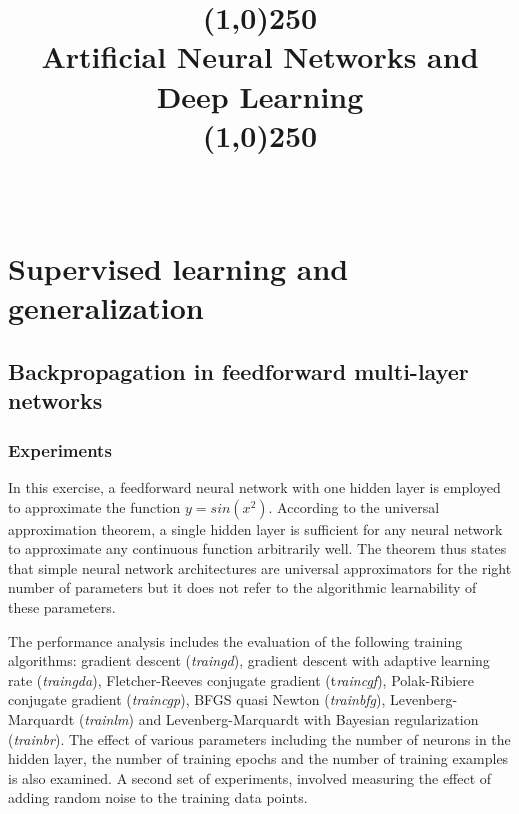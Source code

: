 \documentclass[conference,compsoc]{IEEEtran}
\begin{document}
%
\title{\line(1,0){250}\\Artificial Neural Networks and Deep Learning\\\line(1,0){250}}


\author{
\\
}

% 
\maketitle


\IEEEpeerreviewmaketitle


\thispagestyle{plain}
\pagestyle{plain}

\section{Supervised learning and generalization}

\subsection{Backpropagation in feedforward multi-layer networks}

\subsubsection{Experiments}
In this exercise, a feedforward neural network with one hidden layer is employed to approximate the function $y=sin(x^2)$. According to the universal approximation theorem, a single hidden layer is sufficient for any neural network to approximate any continuous function arbitrarily well. The theorem thus states that simple neural network architectures are universal approximators for the right number of parameters but it does not refer to the algorithmic learnability of these parameters.


The performance analysis includes the evaluation of the following training algorithms: gradient descent (\textit{traingd}), gradient descent with adaptive learning rate (\textit{traingda}), Fletcher-Reeves conjugate gradient (t\textit{raincgf}), Polak-Ribiere conjugate gradient (\textit{traincgp}), BFGS quasi Newton (\textit{trainbfg}), Levenberg-Marquardt (\textit{trainlm}) and Levenberg-Marquardt with Bayesian regularization (\textit{trainbr}). The effect of various parameters including the number of neurons in the hidden layer, the number of training epochs and the number of training examples is also examined. A second set of experiments, involved measuring the effect of adding random noise to the training data points. 
\end{document}
